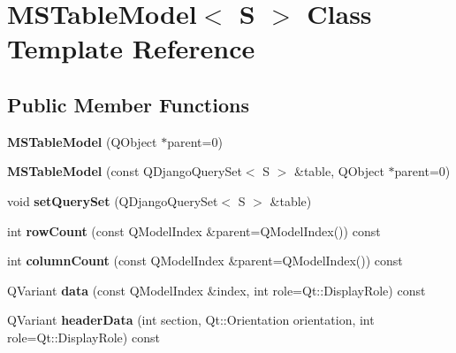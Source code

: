 \hypertarget{class_m_s_table_model}{
\section{MSTableModel$<$ S $>$ Class Template Reference}
\label{class_m_s_table_model}
}
\subsection*{Public Member Functions}
\begin{DoxyCompactItemize}
\item 
\hypertarget{class_m_s_table_model_a0c3c96827752b4a6f035c5698db41e77}{
{\bfseries MSTableModel} (QObject $\ast$parent=0)}
\label{class_m_s_table_model_a0c3c96827752b4a6f035c5698db41e77}

\item 
\hypertarget{class_m_s_table_model_ae08a20072e5f133706c763d0f91f3d66}{
{\bfseries MSTableModel} (const QDjangoQuerySet$<$ S $>$ \&table, QObject $\ast$parent=0)}
\label{class_m_s_table_model_ae08a20072e5f133706c763d0f91f3d66}

\item 
\hypertarget{class_m_s_table_model_a45bf321168ccb70f3ddf2728d779849a}{
void {\bfseries setQuerySet} (QDjangoQuerySet$<$ S $>$ \&table)}
\label{class_m_s_table_model_a45bf321168ccb70f3ddf2728d779849a}

\item 
\hypertarget{class_m_s_table_model_a45c9efc2c66d316329406304dc3752d6}{
int {\bfseries rowCount} (const QModelIndex \&parent=QModelIndex()) const }
\label{class_m_s_table_model_a45c9efc2c66d316329406304dc3752d6}

\item 
\hypertarget{class_m_s_table_model_a6678e120edc1a5d28f3713a0d5f5e144}{
int {\bfseries columnCount} (const QModelIndex \&parent=QModelIndex()) const }
\label{class_m_s_table_model_a6678e120edc1a5d28f3713a0d5f5e144}

\item 
\hypertarget{class_m_s_table_model_a66832fb6bea1e57daa6270c3df846cd2}{
QVariant {\bfseries data} (const QModelIndex \&index, int role=Qt::DisplayRole) const }
\label{class_m_s_table_model_a66832fb6bea1e57daa6270c3df846cd2}

\item 
\hypertarget{class_m_s_table_model_aad624d93e35837323251264e35e1e9c2}{
QVariant {\bfseries headerData} (int section, Qt::Orientation orientation, int role=Qt::DisplayRole) const }
\label{class_m_s_table_model_aad624d93e35837323251264e35e1e9c2}

\end{DoxyCompactItemize}
